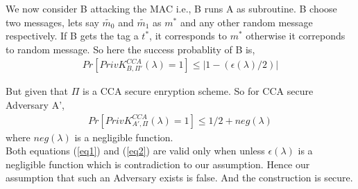 












We now consider B attacking the MAC i.e., B runs A as subroutine. B choose two messages, lets 
say $\widetilde{m_0}$ and $\widetilde{m_1}$ as $m^*$ and any other random message
respectively. If B gets the tag a $t^*$, it corresponds to $m^*$ otherwise it correponds 
to random message. So here the success probablity of B is,
\begin{align}
    Pr[ PrivK_{B,\Pi'}^{CCA}(\lambda) = 1] \leq |1 - (\epsilon(\lambda)/2)|
    \label{eq1}
\end{align}

But given that $\Pi$ is a CCA secure enryption scheme. So for CCA secure Adversary A',
\begin{align}
    Pr[ PrivK_{A',\Pi}^{CCA}(\lambda) = 1]  \leq 1/2 + neg(\lambda)
    \label{eq2}
\end{align}
where $neg(\lambda)$ is a negligible function. \\

Both equations (\ref*{eq1}) and (\ref*{eq2}) are valid only when
unless $\epsilon(\lambda)$ is a negligible function which is contradiction to 
our assumption. Hence our assumption that such an Adversary exists is false. 
And the construction is secure.

